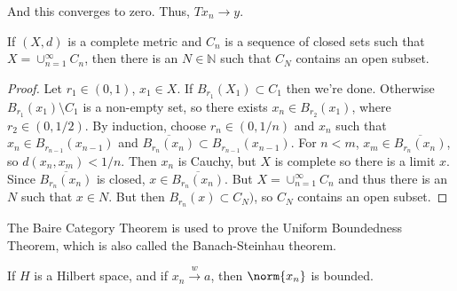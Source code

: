         And this converges to zero. Thus,
        $Tx_{n}\rightarrow{y}$.
        \begin{theorem}
            If $(X,d)$ is a complete metric and
            $C_{n}$ is a sequence of closed sets such
            that $X=\cup_{n=1}^{\infty}C_{n}$, then
            there is an $N\in\mathbb{N}$ such that
            $C_{N}$ contains an open subset.
        \end{theorem}
        \begin{proof}
            Let $r_{1}\in(0,1)$, $x_{1}\in{X}$.
            If $B_{r_{1}}(X_{1})\subset{C_{1}}$ then we're
            done. Otherwise $B_{r_{1}}(x_{1})\setminus{C_{1}}$
            is a non-empty set, so there exists
            $x_{n}\in{B}_{r_{2}}(x_{1})$, where
            $r_{2}\in(0,1/2)$. By induction, choose
            $r_{n}\in(0,1/n)$ and $x_{n}$ such that
            $x_{n}\in{B}_{r_{n-1}}(x_{n-1})$ and
            $\overline{B_{r_{n}}(x_{n})}\subset%
             B_{r_{n-1}}(x_{n-1})$. For $n<m$,
            $x_{m}\in\overline{B_{r_{n}}(x_{n})}$,
            so $d(x_{n},x_{m})<1/n$. Then $x_{n}$ is
            Cauchy, but $X$ is complete so there is a limit
            $x$. Since $\overline{B_{r_{n}}(x_{n})}$ is
            closed, $x\in\overline{B_{r_{n}}(x_{n})}$. But
            $X=\cup_{n=1}^{\infty}C_{n}$ and thus there is
            an $N$ such that $x\in{N}$. But then
            $B_{r_{n}}(x)\subset{C}_{N})$, so $C_{N}$ contains
            an open subset.
        \end{proof}
        The Baire Category Theorem is used to prove the
        Uniform Boundedness Theorem, which is also called
        the Banach-Steinhau theorem.
        \begin{theorem}
            If $H$ is a Hilbert space, and if
            $x_{n}\overset{w}{\rightarrow}{a}$, then
            $\norm{x_{n}}$ is bounded.
        \end{theorem}
